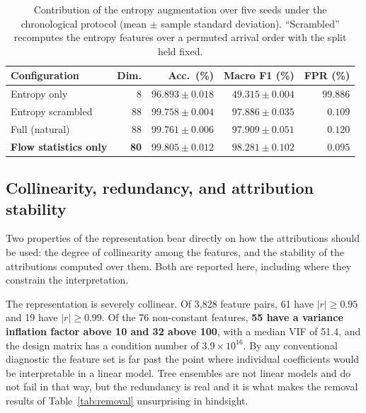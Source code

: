 \documentclass{ieeeaccess}
\begin{document}
\begin{table}[!t]
\caption{Contribution of the entropy augmentation over five seeds under the
chronological protocol (mean $\pm$ sample standard deviation). ``Scrambled''
recomputes the entropy features over a permuted arrival order with the split
held fixed.}
\centering
\label{tab:entropycontrib}
\footnotesize
\setlength{\tabcolsep}{1.5pt}
\renewcommand{\arraystretch}{1.2}
\begin{tabular}{@{}lrrrr@{}}
\toprule
\textbf{Configuration} & \textbf{Dim.} & \textbf{Acc.\ (\%)} &
\textbf{Macro F1 (\%)} & \textbf{FPR (\%)} \\
\midrule
Entropy only          & 8  & $96.893 \pm 0.018$ & $49.315 \pm 0.004$ & $99.886$ \\
Entropy scrambled     & 88 & $99.758 \pm 0.004$ & $97.886 \pm 0.035$ & $0.109$ \\
Full (natural)        & 88 & $99.761 \pm 0.006$ & $97.909 \pm 0.051$ & $0.120$ \\
\textbf{Flow statistics only} & \textbf{80} & $\mathbf{99.805 \pm 0.012}$ &
$\mathbf{98.281 \pm 0.102}$ & $\mathbf{0.095}$ \\
\bottomrule
\end{tabular}
\end{table}

\subsection{Collinearity, redundancy, and attribution stability}
\label{sec:shapstability}
Two properties of the representation bear directly on how the attributions
should be used: the degree of collinearity among the features, and the
stability of the attributions computed over them. Both are reported here,
including where they constrain the interpretation.

The representation is severely collinear. Of 3{,}828 feature pairs, 61 have
$|r| \geq 0.95$ and 19 have $|r| \geq 0.99$. Of the 76 non-constant features,
\textbf{55 have a variance inflation factor above 10 and 32 above 100}, with a
median VIF of 51.4, and the design matrix has a condition number of
$3.9 \times 10^{16}$. By any conventional diagnostic the feature set is far past
the point where individual coefficients would be interpretable in a linear model.
Tree ensembles are not linear models and do not fail in that way, but the
redundancy is real and it is what makes the removal results of
Table~\ref{tab:removal} unsurprising in hindsight.
\end{document}
